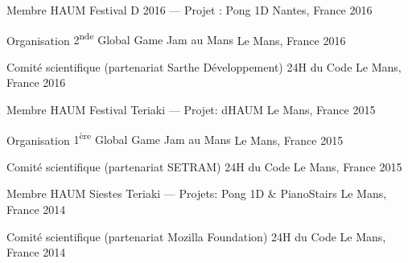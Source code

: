 

\begin{cvhonors}

  \cvhonor
		{Membre HAUM} %
		{Festival D 2016 --- Projet : Pong 1D} %
    {Nantes, France} %
    {2016} %

  \cvhonor
    {Organisation} %
		{2\textsuperscript{nde} Global Game Jam au Mans} %
    {Le Mans, France} %
    {2016} %

  \cvhonor
		{Comité scientifique (partenariat Sarthe Développement)} %
    {24H du Code} %
		{Le Mans, France} %
    {2016} %

  \cvhonor
		{Membre HAUM} %
    {Festival Teriaki --- Projet: dHAUM} %
		{Le Mans, France} %
    {2015} %

  \cvhonor
    {Organisation} %
		{1\textsuperscript{ère} Global Game Jam au Mans} %
    {Le Mans, France} %
    {2015} %

  \cvhonor
		{Comité scientifique (partenariat SETRAM)} %
    {24H du Code} %
		{Le Mans, France} %
    {2015} %

  \cvhonor
		{Membre HAUM} %
		{Siestes Teriaki --- Projets: Pong 1D \& PianoStairs} %
		{Le Mans, France} %
    {2014} %

  \cvhonor
		{Comité scientifique (partenariat Mozilla Foundation)} %
    {24H du Code} %
		{Le Mans, France} %
    {2014} %

\end{cvhonors}
